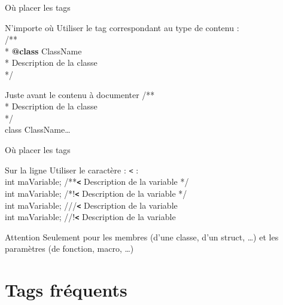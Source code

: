 \documentclass{beamer}
\begin{document}
\begin{frame}{Où placer les tags}
\begin{block}{N'importe où}
Utiliser le tag correspondant au type de contenu :\\
/**\\
 * \textcolor{dgreen}{\textbf{@class}} ClassName\\
 * Description de la classe\\
 */\\
\end{block}

\begin{block}{Juste avant le contenu à documenter}
/**\\
 * Description de la classe\\
 */\\
 class ClassName\dots
\end{block}

\end{frame}

\begin{frame}{Où placer les tags}
\begin{block}{Sur la ligne}
Utiliser le caractère : \textcolor{dgreen}{\verb?<?} :\\
int maVariable; /**\textcolor{dgreen}{\textbf{\verb?<?}} Description de la variable */\\
int maVariable; /*!\textcolor{dgreen}{\textbf{\verb?<?}} Description de la variable */\\
int maVariable; ///\textcolor{dgreen}{\textbf{\verb?<?}} Description de la variable \\
int maVariable; //!\textcolor{dgreen}{\textbf{\verb?<?}} Description de la variable \\
\end{block}

\begin{alertblock}{Attention}
Seulement pour les membres (d'une classe, d'un struct, \dots) et les paramètres (de fonction, macro, \dots)
\end{alertblock}

\end{frame}


\section{Tags fréquents}
\subsection{}
\end{document}
